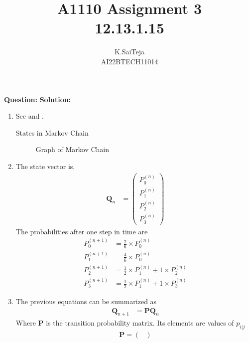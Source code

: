 \documentclass[journal,12pt,two column]{IEEEtran}
\title{A1110 Assignment 3 \\ 12.13.1.15}
\author{K.SaiTeja \\ AI22BTECH11014}
\newcommand{\question}{\noindent \textbf{Question: }}
\newcommand{\solution}{\noindent \textbf{Solution: }}
\providecommand{\prt}[2]{\ensuremath{P_{#1}^{\left(#2\right)} }}        %
\theoremstyle{remark}
\newcommand{\myvec}[1]{\ensuremath{\begin{pmatrix}#1\end{pmatrix}}}
\let\vec\mathbf
\begin{document}
\maketitle
\question
\solution\tableofcontents
\fi
\begin{enumerate}
	\item  See 
	and 
        .
    \begin{table}[ht!]
        \centering
    	
        \caption{States in Markov Chain}
        \label{tab:ncert/12/13/1/15m/States}	
    \end{table}
\begin{figure}[!ht]
        \centering
          
        \caption{Graph of Markov Chain}
        \label{fig:ncert/12/13/1/15m/ markov_chain}
\end{figure}
\item 
    The state vector is,   
    \begin{align}
        \vec{Q}_n &= \myvec{\prt{0}{n}\\ 
        			        \prt{1}{n} \\
        			        \prt{2}{n} \\
        			        \prt{3}{n} 
        			        }        
    \end{align}    
    The probabilities after one step in time are
    \begin{align}
       \prt{0}{n+1} &= \frac{2}{6} \times \prt{0}{n}  \\
       \prt{1}{n+1} &= \frac{4}{6} \times \prt{0}{n}  \\
       \prt{2}{n+1} &= \frac{1}{2} \times \prt{1}{n} + 1 \times \prt{2}{n}
\\
       \prt{3}{n+1} &= \frac{1}{2} \times \prt{1}{n} + 1 \times \prt{3}{n} 
    \end{align}
   \item  
    The previous equations can be summarized as
    \begin{align}
        \vec{Q}_{n+1} &= \vec{P}\vec{Q}_n 
        \label{eq:ncert/12/13/1/15m/transtition}        
    \end{align}
		Where $\vec{P}$ is the transition probability matrix. Its elements are values of $p_{i|j}$
    \begin{align}
        \vec{P}= \myvec{} 
    \end{align}

\end{enumerate}
\end{document}
